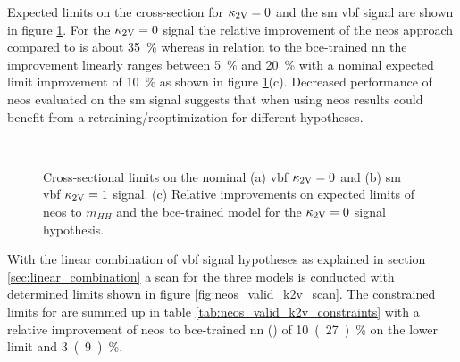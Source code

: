 Expected limits on the cross-section for $\kappa_{\text{2V}}=0$ and the \ac{sm} \ac{vbf} signal are shown in figure \ref{fig:neos_valid_brazil_limits}. For the $\kappa_{\text{2V}}=0$ signal the relative improvement of the \ac{neos} approach compared to \mhh is about \qty[]{35}{\percent} whereas in relation to the \ac{bce}-trained \ac{nn} the improvement linearly ranges between \qty[]{5}{\percent} and \qty[]{20}{\percent} with a nominal expected limit improvement of \qty[]{10}{\percent} as shown in figure \ref{fig:neos_valid_brazil_limits}(c). Decreased performance of \ac{neos} evaluated on the \ac{sm} signal suggests that when using neos results could benefit from a retraining/reoptimization for different \ktwov hypotheses.
\begin{figure}
    \centering
    \\
    \caption[]{Cross-sectional limits on the nominal (a) \ac{vbf} $\kappa_{\text{2V}}=0$ and (b) \ac{sm} \ac{vbf} $\kappa_{\text{2V}}=1$ signal. (c) Relative improvements on expected limits of neos to $m_{HH}$ and the \ac{bce}-trained model for the $\kappa_{\text{2V}}=0$ signal hypothesis.}
    \label{fig:neos_valid_brazil_limits}
\end{figure}

With the linear combination of \ac{vbf} signal hypotheses as explained in section \ref{sec:linear_combination} a \ktwov scan for the three models is conducted with determined limits shown in figure \ref{fig:neos_valid_k2v_scan}. The constrained limits for \ktwov are summed up in table \ref{tab:neos_valid_k2v_constraints} with a relative improvement of neos to \ac{bce}-trained \ac{nn} (\mhh) of \qty[]{10}{(27)\percent} on the lower limit and \qty[]{3}{(9)\percent}.



\begin{figure}
    \centering
     \\
    \caption[]{}
    \label{fig:reweight_validation}
\end{figure}




